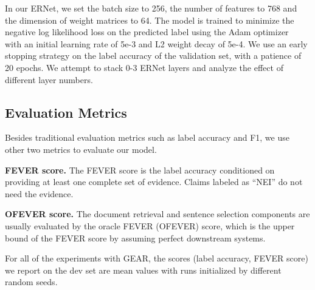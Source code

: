 \documentclass[11pt,a4paper]{article}
\begin{document}
In our ERNet, we set the batch size to 256, the number of features  to 768 and the dimension of weight matrices  to 64. The model is trained to minimize the negative log likelihood loss on the predicted label using the Adam optimizer~\cite{kingma2015adam} with an initial learning rate of 5e-3 and L2 weight decay of 5e-4. We use an early stopping strategy on the label accuracy of the validation set, with a patience of 20 epochs. We attempt to stack 0-3 ERNet layers and analyze the effect of different layer numbers.

\subsection{Evaluation Metrics}
Besides traditional evaluation metrics such as label accuracy and F1, we use other two metrics to evaluate our model.

\textbf{FEVER score.} The FEVER score is the label accuracy conditioned on providing at least one complete set of evidence. Claims labeled as ``NEI'' do not need the evidence. 

\textbf{OFEVER score.} The document retrieval and sentence selection components are usually evaluated by the oracle FEVER (OFEVER) score, which is the upper bound of the FEVER score by assuming perfect downstream systems.  
 
For all of the experiments with GEAR, the scores (label accuracy, FEVER score) we report on the dev set are mean values with  runs initialized by different random seeds.


\begin{table}[t]
\begin{center}
\end{center}
\caption{\label{tab:document-retrieval} Document retrieval evaluation on dev set (\%). ('-' denotes a missing value)}
\end{table}
\end{document}
